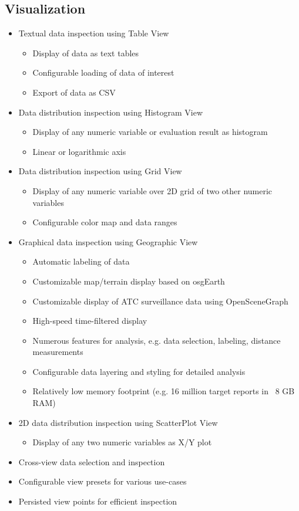 \subsection{Visualization}
\begin{itemize}  
    \item Textual data inspection using Table View
    \begin{itemize}  
        \item Display of data as text tables
        \item Configurable loading of data of interest
        \item Export of data as CSV
    \end{itemize}
    \item Data distribution inspection using Histogram View
    \begin{itemize}  
        \item Display of any numeric variable or evaluation result as histogram
        \item Linear or logarithmic axis
    \end{itemize}
        \item Data distribution inspection using Grid View
    \begin{itemize}  
        \item Display of any numeric variable over 2D grid of two other numeric variables
        \item Configurable color map and data ranges
    \end{itemize}
    \item Graphical data inspection using Geographic View
    \begin{itemize}  
        \item Automatic labeling of data
        \item Customizable map/terrain display based on osgEarth
        \item Customizable display of ATC surveillance data using OpenSceneGraph
        \item High-speed time-filtered display
        \item Numerous features for analysis, e.g. data selection, labeling, distance measurements
        \item Configurable data layering and styling for detailed analysis
        \item Relatively low memory footprint (e.g. 16 million target reports in ~8 GB RAM)
    \end{itemize}    
    \item 2D data distribution inspection using ScatterPlot View
    \begin{itemize}  
        \item Display of any two numeric variables as X/Y plot
    \end{itemize}
    \item Cross-view data selection and inspection
    \item Configurable view presets for various use-cases
    \item Persisted view points for efficient inspection
\end{itemize}

